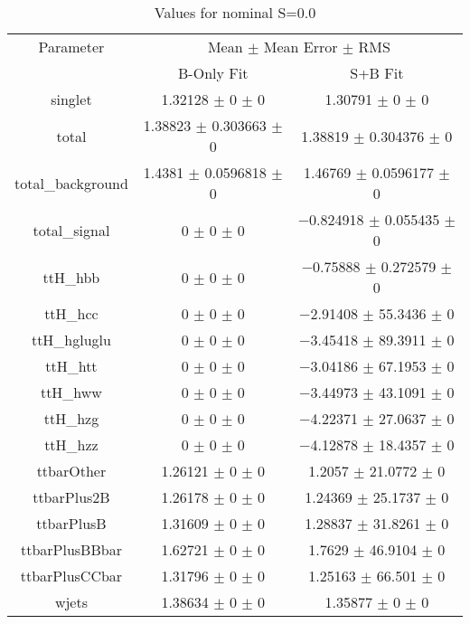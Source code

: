 \begin{table}
\centering
\caption{Values for nominal S=0.0}
\begin{tabular}{ccc}
\toprule
Parameter & \multicolumn{2}{c}{Mean $\pm$ Mean Error $\pm$ RMS}\\
 & B-Only Fit & S+B Fit\\
\midrule
singlet & \num{1.32128} $\pm$ \num{0} $\pm$ \num{0} & \num{1.30791} $\pm$ \num{0} $\pm$ \num{0}\\
total & \num{1.38823} $\pm$ \num{0.303663} $\pm$ \num{0} & \num{1.38819} $\pm$ \num{0.304376} $\pm$ \num{0}\\
total\_background & \num{1.4381} $\pm$ \num{0.0596818} $\pm$ \num{0} & \num{1.46769} $\pm$ \num{0.0596177} $\pm$ \num{0}\\
total\_signal & \num{0} $\pm$ \num{0} $\pm$ \num{0} & \num{-0.824918} $\pm$ \num{0.055435} $\pm$ \num{0}\\
ttH\_hbb & \num{0} $\pm$ \num{0} $\pm$ \num{0} & \num{-0.75888} $\pm$ \num{0.272579} $\pm$ \num{0}\\
ttH\_hcc & \num{0} $\pm$ \num{0} $\pm$ \num{0} & \num{-2.91408} $\pm$ \num{55.3436} $\pm$ \num{0}\\
ttH\_hgluglu & \num{0} $\pm$ \num{0} $\pm$ \num{0} & \num{-3.45418} $\pm$ \num{89.3911} $\pm$ \num{0}\\
ttH\_htt & \num{0} $\pm$ \num{0} $\pm$ \num{0} & \num{-3.04186} $\pm$ \num{67.1953} $\pm$ \num{0}\\
ttH\_hww & \num{0} $\pm$ \num{0} $\pm$ \num{0} & \num{-3.44973} $\pm$ \num{43.1091} $\pm$ \num{0}\\
ttH\_hzg & \num{0} $\pm$ \num{0} $\pm$ \num{0} & \num{-4.22371} $\pm$ \num{27.0637} $\pm$ \num{0}\\
ttH\_hzz & \num{0} $\pm$ \num{0} $\pm$ \num{0} & \num{-4.12878} $\pm$ \num{18.4357} $\pm$ \num{0}\\
ttbarOther & \num{1.26121} $\pm$ \num{0} $\pm$ \num{0} & \num{1.2057} $\pm$ \num{21.0772} $\pm$ \num{0}\\
ttbarPlus2B & \num{1.26178} $\pm$ \num{0} $\pm$ \num{0} & \num{1.24369} $\pm$ \num{25.1737} $\pm$ \num{0}\\
ttbarPlusB & \num{1.31609} $\pm$ \num{0} $\pm$ \num{0} & \num{1.28837} $\pm$ \num{31.8261} $\pm$ \num{0}\\
ttbarPlusBBbar & \num{1.62721} $\pm$ \num{0} $\pm$ \num{0} & \num{1.7629} $\pm$ \num{46.9104} $\pm$ \num{0}\\
ttbarPlusCCbar & \num{1.31796} $\pm$ \num{0} $\pm$ \num{0} & \num{1.25163} $\pm$ \num{66.501} $\pm$ \num{0}\\
wjets & \num{1.38634} $\pm$ \num{0} $\pm$ \num{0} & \num{1.35877} $\pm$ \num{0} $\pm$ \num{0}\\
\bottomrule
\end{tabular}
\end{table}